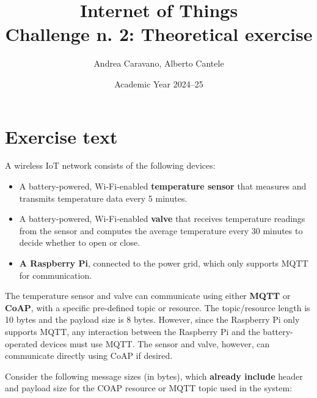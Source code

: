 \documentclass[a4paper,11pt]{article} %
\begin{document}
    \pagestyle{fancy}
    \fancyhead{}\fancyfoot{}
    \fancyfoot[C]{\thepage}

    \title{\textbf{Internet of Things}\\Challenge n. 2: Theoretical exercise}
    \author{Andrea Caravano, Alberto Cantele}
    \date{Academic Year 2024--25}
    \maketitle

    \tableofcontents

    \newpage


    \section{Exercise text}\label{sec:exercise-text}
    A wireless IoT network consists of the following devices:

    \begin{itemize}
        \item A battery-powered, Wi-Fi-enabled \textbf{temperature sensor} that measures and transmits temperature data every 5 minutes.
        \item A battery-powered, Wi-Fi-enabled \textbf{valve} that receives temperature readings from the sensor and computes the average temperature every 30 minutes to decide whether to open or close.
        \item \textbf{A Raspberry Pi}, connected to the power grid, which only supports MQTT for communication.
    \end{itemize}

    The temperature sensor and valve can communicate using either \textbf{MQTT} or \textbf{CoAP}, with a specific pre-defined topic or resource.
    The topic/resource length is 10 bytes and the payload size is 8 bytes.
    However, since the Raspberry Pi only supports MQTT, any interaction between the Raspberry Pi and the battery-operated devices must use MQTT.
    The sensor and valve, however, can communicate directly using CoAP if desired.

    Consider the following message sizes (in bytes), which \textbf{already include} header and payload size for the COAP resource or MQTT topic used in the system:

    \label{message-sizes-table}
\end{document}
